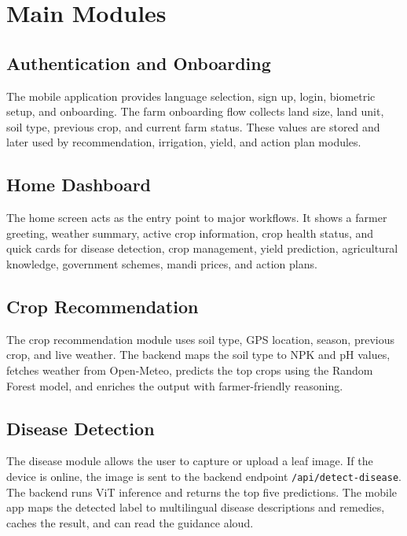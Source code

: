 \documentclass[12pt,a4paper]{report}
\begin{document}
\section{Main Modules}

\subsection{Authentication and Onboarding}

The mobile application provides language selection, sign up, login, biometric setup, and onboarding. The farm onboarding flow collects land size, land unit, soil type, previous crop, and current farm status. These values are stored and later used by recommendation, irrigation, yield, and action plan modules.

\subsection{Home Dashboard}

The home screen acts as the entry point to major workflows. It shows a farmer greeting, weather summary, active crop information, crop health status, and quick cards for disease detection, crop management, yield prediction, agricultural knowledge, government schemes, mandi prices, and action plans.

\subsection{Crop Recommendation}

The crop recommendation module uses soil type, GPS location, season, previous crop, and live weather. The backend maps the soil type to NPK and pH values, fetches weather from Open-Meteo, predicts the top crops using the Random Forest model, and enriches the output with farmer-friendly reasoning.

\subsection{Disease Detection}

The disease module allows the user to capture or upload a leaf image. If the device is online, the image is sent to the backend endpoint \texttt{/api/detect-disease}. The backend runs ViT inference and returns the top five predictions. The mobile app maps the detected label to multilingual disease descriptions and remedies, caches the result, and can read the guidance aloud.
\end{document}
